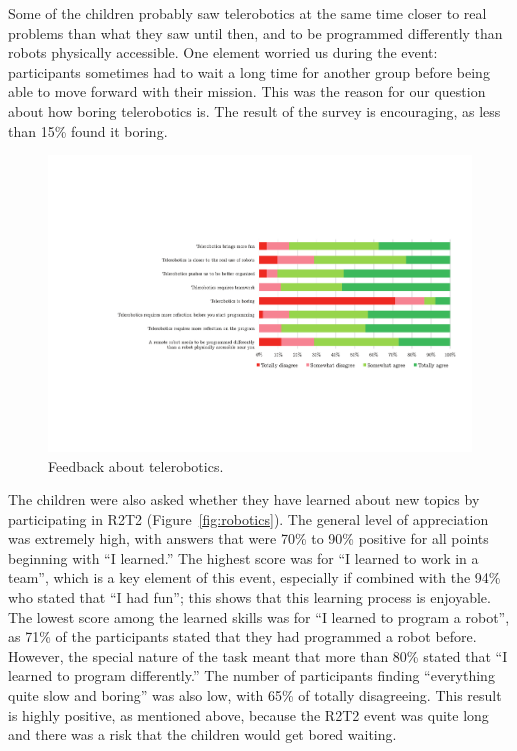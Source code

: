 \documentclass{intech-journal}
\begin{document}
Some of the children probably saw telerobotics at the same time closer to real problems than what they saw until then, and to be programmed differently than robots physically accessible.
One element worried us during the event: participants sometimes had to wait a long time for another group before being able to move forward with their mission. 
This was the reason for our question about how boring telerobotics is.
The result of the survey is encouraging, as less than 15\% found it boring.


\begin{figure}[ht]
 \centering
    \includegraphics[width=\columnwidth]{figures/telerobotics.pdf}
  \caption{Feedback about telerobotics.}
  \label{fig:tele} 
\end{figure}

The children were also asked whether they have learned about new topics by participating in R2T2 (Figure~\ref{fig:robotics}). 
The general level of appreciation was extremely high, with answers that were 70\% to 90\% positive for all points beginning with ``I learned.''
The highest score was for ``I learned to work in a team'', which is a key element of this event, especially if combined with the 94\% who stated that ``I had fun''; this shows that this learning process is enjoyable.
The lowest score among the learned skills was for ``I learned to program a robot'', as 71\% of the participants stated that they had programmed a robot before.
However, the special nature of the task meant that more than 80\% stated that ``I learned to program differently.''
The number of participants finding ``everything quite slow and boring'' was also low, with 65\% of totally disagreeing. 
This result is highly positive, as mentioned above, because the R2T2 event was quite long and there was a risk that the children would get bored waiting. 
\end{document}
